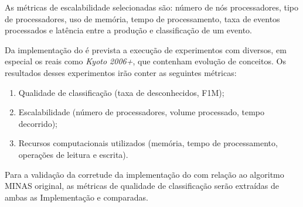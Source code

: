 As métricas de escalabilidade selecionadas são: número de nós processadores,
tipo de processadores, uso de memória, tempo de processamento, taxa de eventos
processados e latência entre a produção e classificação de um evento.



Da implementação do \mfog é prevista a execução de experimentos com \datasets
diversos, em especial os \datasets reais como \emph{Kyoto 2006+},
que contenham evolução de conceitos.
Os resultados desses experimentos irão conter as seguintes métricas:

\begin{enumerate}[label={\alph*)}]
  \item Qualidade de classificação (taxa de desconhecidos, F1M);
  \item Escalabilidade (número de processadores, volume processado, tempo
  decorrido);
  \item Recursos computacionais utilizados (memória, tempo de processamento,
  operações de leitura e escrita).
\end{enumerate}

Para a validação da corretude da implementação do \mfog com relação ao algoritmo
MINAS original, as métricas de qualidade de classificação serão extraídas de
ambas as Implementação e comparadas.
